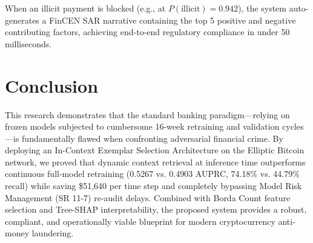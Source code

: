 \documentclass[conference]{IEEEtran}
\begin{document}
When an illicit payment is blocked (e.g., at $P(\text{illicit}) = 0.942$), the system auto-generates a FinCEN SAR narrative containing the top 5 positive and negative contributing factors, achieving end-to-end regulatory compliance in under 50 milliseconds.

\section{Conclusion}
This research demonstrates that the standard banking paradigm---relying on frozen models subjected to cumbersome 16-week retraining and validation cycles---is fundamentally flawed when confronting adversarial financial crime. By deploying an In-Context Exemplar Selection Architecture on the Elliptic Bitcoin network, we proved that dynamic context retrieval at inference time outperforms continuous full-model retraining (0.5267 vs. 0.4903 AUPRC, 74.18\% vs. 44.79\% recall) while saving \$51,640 per time step and completely bypassing Model Risk Management (SR 11-7) re-audit delays. Combined with Borda Count feature selection and Tree-SHAP interpretability, the proposed system provides a robust, compliant, and operationally viable blueprint for modern cryptocurrency anti-money laundering.
\end{document}
